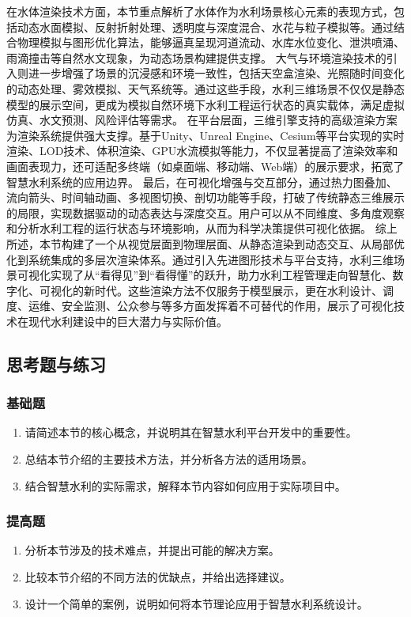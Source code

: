 {{{{{{{{{{在水体渲染技术方面，本节重点解析了水体作为水利场景核心元素的表现方式，包括动态水面模拟、反射折射处理、透明度与深度混合、水花与粒子模拟等。通过结合物理模拟与图形优化算法，能够逼真呈现河道流动、水库水位变化、泄洪喷涌、雨滴撞击等自然水文现象，为动态场景构建提供支撑。
大气与环境渲染技术的引入则进一步增强了场景的沉浸感和环境一致性，包括天空盒渲染、光照随时间变化的动态处理、雾效模拟、天气系统等。通过这些手段，水利三维场景不仅仅是静态模型的展示空间，更成为模拟自然环境下水利工程运行状态的真实载体，满足虚拟仿真、水文预测、风险评估等需求。
在平台层面，三维引擎支持的高级渲染方案为渲染系统提供强大支撑。基于Unity、Unreal
Engine、Cesium等平台实现的实时渲染、LOD技术、体积渲染、GPU水流模拟等能力，不仅显著提高了渲染效率和画面表现力，还可适配多终端（如桌面端、移动端、Web端）的展示要求，拓宽了智慧水利系统的应用边界。
最后，在可视化增强与交互部分，通过热力图叠加、流向箭头、时间轴动画、多视图切换、剖切功能等手段，打破了传统静态三维展示的局限，实现数据驱动的动态表达与深度交互。用户可以从不同维度、多角度观察和分析水利工程的运行状态与环境影响，从而为科学决策提供可视化依据。
综上所述，本节构建了一个从视觉层面到物理层面、从静态渲染到动态交互、从局部优化到系统集成的多层次渲染体系。通过引入先进图形技术与平台支持，水利三维场景可视化实现了从``看得见''到``看得懂''的跃升，助力水利工程管理走向智慧化、数字化、可视化的新时代。这些渲染方法不仅服务于模型展示，更在水利设计、调度、运维、安全监测、公众参与等多方面发挥着不可替代的作用，展示了可视化技术在现代水利建设中的巨大潜力与实际价值。
\subsection{思考题与练习}\label{ux601dux8003ux9898ux4e0eux7ec3ux4e60-6} \subsubsection{基础题}\label{ux57faux7840ux9898-6}
\begin{enumerate} \def\labelenumi{\arabic{enumi}.} \tightlist \item 请简述本节的核心概念，并说明其在智慧水利平台开发中的重要性。 \item
总结本节介绍的主要技术方法，并分析各方法的适用场景。 \item 结合智慧水利的实际需求，解释本节内容如何应用于实际项目中。 \end{enumerate}
\subsubsection{提高题}\label{ux63d0ux9ad8ux9898-6} \begin{enumerate} \def\labelenumi{\arabic{enumi}.} \tightlist \item
分析本节涉及的技术难点，并提出可能的解决方案。 \item 比较本节介绍的不同方法的优缺点，并给出选择建议。 \item 设计一个简单的案例，说明如何将本节理论应用于智慧水利系统设计。 \end{enumerate}
}}}}}}}}}}
